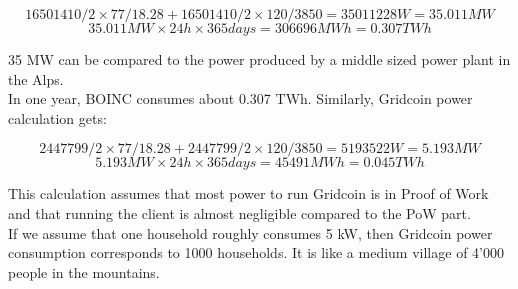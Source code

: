 \[ 16501410/2 \times 77/18.28 + 16501410/2 \times 120/3850 = 35011228 W = 35.011 MW \]
\[ 35.011MW \times 24 h \times 365 days = 306696 MWh = 0.307 TWh \]

35 MW can be compared to the power produced by a middle sized power plant in the Alps. \\
In one year, BOINC consumes about 0.307 TWh. Similarly, Gridcoin power calculation gets:

\[ 2447799/2 \times 77/18.28 + 2447799/2 \times 120/3850 = 5193522 W = 5.193 MW \]
\[ 5.193MW \times 24 h \times 365 days = 45491 MWh = 0.045 TWh \]

This calculation assumes that most power to run Gridcoin is in Proof of Work and that running the client is almost negligible compared to the PoW part.\\
If we assume that one household roughly consumes 5 kW, then Gridcoin power consumption corresponds to 1000 households. It is like a medium village of 4'000 people in the mountains.\\


